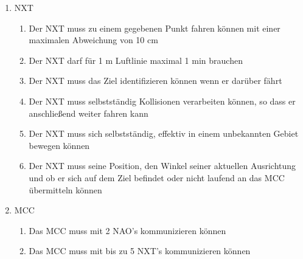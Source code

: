 \begin{enumerate}
\begin{enumerate}
    \end{enumerate}
    \item NXT
    \begin{enumerate}
        \item Der NXT muss zu einem gegebenen Punkt fahren können mit einer maximalen Abweichung von 10 cm

        \item Der NXT darf für 1 m Luftlinie maximal 1 min brauchen

        \item Der NXT muss das Ziel identifizieren können wenn er darüber fährt

        \item Der NXT muss selbstständig Kollisionen verarbeiten können, so dass er anschließend weiter fahren kann

        \item Der NXT muss sich selbstständig, effektiv in einem unbekannten Gebiet bewegen können
        
        \item Der NXT muss seine Position, den Winkel seiner aktuellen Ausrichtung und ob er sich auf dem Ziel befindet oder nicht laufend an das MCC übermitteln können


    \end{enumerate}
    \item MCC
    \begin{enumerate}
        \item Das MCC muss mit 2 NAO's kommunizieren können

        \item Das MCC muss mit bis zu 5 NXT's kommunizieren können
        

\end{enumerate}
\end{enumerate}

